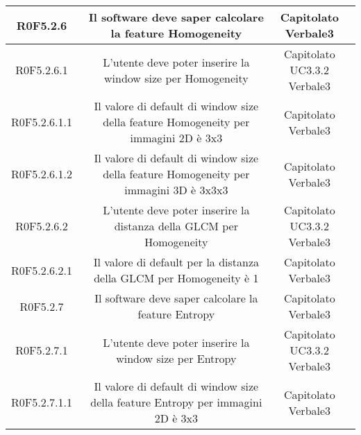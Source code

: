 \begin{center}
\begin{longtable}{|c|c|c|c|}
\hline
R0F5.2.6   & \parbox[t]{\larghezza}{Il software deve saper calcolare la feature\glossario{} Homogeneity}  & \parbox[t]{\dimFonti}{ Capitolato \\ Verbale3 \\} \\
\hline
R0F5.2.6.1   & \parbox[t]{\larghezza}{L'utente deve poter inserire la window size per Homogeneity}  & \parbox[t]{\dimFonti}{ Capitolato \\ UC3.3.2 \\ Verbale3 \\} \\
\hline
R0F5.2.6.1.1   & \parbox[t]{\larghezza}{Il valore di default di window size della feature\glossario{} Homogeneity per immagini 2D è 3x3 }  & \parbox[t]{\dimFonti}{ Capitolato \\ Verbale3 \\} \\
\hline
R0F5.2.6.1.2   & \parbox[t]{\larghezza}{Il valore di default di window size della feature\glossario{} Homogeneity per immagini 3D è 3x3x3}  & \parbox[t]{\dimFonti}{ Capitolato \\ Verbale3 \\} \\
\hline
R0F5.2.6.2   & \parbox[t]{\larghezza}{L'utente deve poter inserire la distanza della GLCM per Homogeneity}  & \parbox[t]{\dimFonti}{ Capitolato \\ UC3.3.2 \\ Verbale3 \\} \\
\hline
R0F5.2.6.2.1   & \parbox[t]{\larghezza}{Il valore di default per la distanza della GLCM per Homogeneity è 1}  & \parbox[t]{\dimFonti}{ Capitolato \\ Verbale3 \\} \\
\hline
R0F5.2.7   & \parbox[t]{\larghezza}{Il software deve saper calcolare la feature\glossario{} Entropy}  & \parbox[t]{\dimFonti}{ Capitolato \\ Verbale3 \\} \\
\hline
R0F5.2.7.1   & \parbox[t]{\larghezza}{L'utente deve poter inserire la window size per Entropy}  & \parbox[t]{\dimFonti}{ Capitolato \\ UC3.3.2 \\ Verbale3 \\} \\
\hline
R0F5.2.7.1.1   & \parbox[t]{\larghezza}{Il valore di default di window size della feature\glossario{} Entropy per immagini 2D è 3x3 }  & \parbox[t]{\dimFonti}{ Capitolato \\ Verbale3 \\} \\

\end{longtable}
\end{center}
